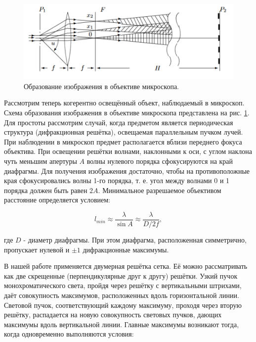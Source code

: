 \documentclass[a4paper, 12pt]{article}
\begin{document}
\begin{figure}[h]
\begin{center}
\includegraphics[width=1\textwidth]{Pic1.png}
\end{center}
\caption{Образование изображения в объективе микроскопа.} \label{Образование изображения}
\end{figure}

Рассмотрим теперь когерентно освещённый объект, наблюдаемый в микроскоп. Схема образования
изображения в объективе микроскопа представлена на рис. \ref{Образование изображения}. Для простоты рассмотрим случай,
когда предметом является периодическая структура (дифракционная решётка), освещаемая
параллельным пучком лучей. При наблюдении в микроскоп предмет располагается вблизи переднего
фокуса объектива. При освещении решётки волнами, наклонными к оси, с углом наклона чуть
меньшим апертуры $A$ волны нулевого порядка сфокусируются на край диафрагмы. Для получения
изображения достаточно, чтобы на противоположные края сфокусировались волны 1-го порядка,
т. е. угол между волнами 0 и 1 порядка должен быть равен $2A$. Минимальное разрешаемое объективом расстояние определяется условием:

\begin{equation} \label{l_min}
l_{min}\approx\dfrac{\lambda}{\sin A}\approx\dfrac{\lambda}{D/2f},
\end{equation}

где $D$ - диаметр диафрагмы. При этом диафрагма, расположенная симметрично, пропускает нулевой и $\pm 1$ дифракционные максимумы.

В нашей работе применяется двумерная решётка сетка. Её можно рассматривать как две
скрещенные (перпендикулярные друг к другу) решётки. Узкий пучок монохроматического света,
пройдя через решётку с вертикальными штрихами, даёт совокупность максимумов, расположенных
вдоль горизонтальной линии. Световой пучок, соответствующий каждому максимуму, проходя через
вторую решётку, распадается на новую совокупность световых пучков, дающих максимумы вдоль 
вертикальной линии. Главные максимумы возникают тогда, когда одновременно выполняются
условия:  
\end{document}
